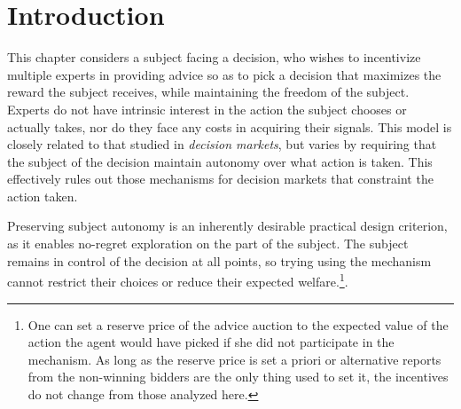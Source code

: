 
\section{Introduction}



This chapter considers a subject facing a decision, who wishes to incentivize multiple experts in providing advice so as to pick a decision that maximizes the reward the subject receives, while maintaining the freedom of the subject.
Experts do not have intrinsic interest in the action the subject chooses or actually takes, nor do they face any costs in acquiring their signals.
This model is closely related to that studied in \emph{decision markets}, but varies by requiring that the subject of the decision maintain autonomy over what action is taken. This effectively rules out those mechanisms for decision markets that constraint the action taken.

Preserving subject autonomy is an inherently desirable practical design criterion, as it enables no-regret exploration on the part of the subject. The subject remains in control of the decision at all points, so trying using the mechanism cannot restrict their choices or reduce their expected welfare.\footnote{One can set a reserve price of the advice auction to the expected value of the action the agent would have picked if she did not participate in the mechanism. As long as the reserve price is set a priori or alternative reports from the non-winning bidders are the only thing used to set it, the incentives do not change from those analyzed here.}.



